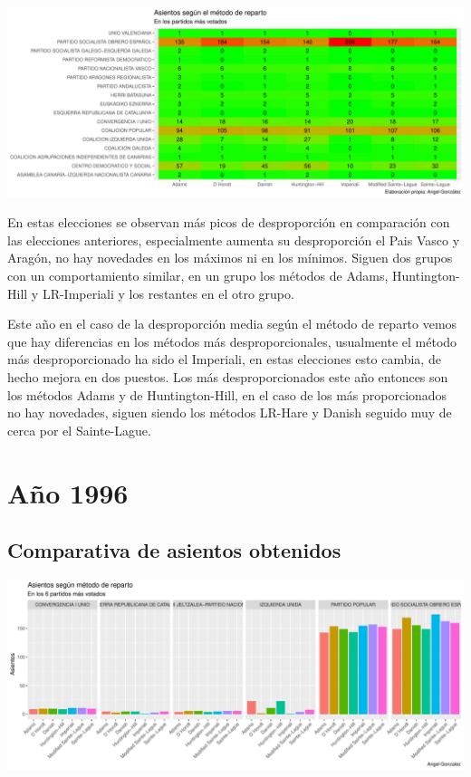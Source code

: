 \documentclass[12pt,a4paper,]{book}
\numberwithin{dummy}{section}
\theoremstyle{ocrenumbox}
\theoremstyle{blacknumex}
\theoremstyle{blacknumbox}
\theoremstyle{ocrenum}
\theoremstyle{ocrenum}
\begin{document}
\begin{center}\includegraphics[width=1\linewidth]{figurasR/unnamed-chunk-89-2} \end{center}

En estas elecciones se observan más picos de desproporción en
comparación con las elecciones anteriores, especialmente aumenta su
desproporción el Pais Vasco y Aragón, no hay novedades en los máximos ni
en los mínimos. Siguen dos grupos con un comportamiento similar, en un
grupo los métodos de Adams, Huntington-Hill y LR-Imperiali y los
restantes en el otro grupo.

Este año en el caso de la desproporción media según el método de reparto
vemos que hay diferencias en los métodos más desproporcionales,
usualmente el método más desproporcionado ha sido el Imperiali, en estas
elecciones esto cambia, de hecho mejora en dos puestos. Los más
desproporcionados este año entonces son los métodos Adams y de
Huntington-Hill, en el caso de los más proporcionados no hay novedades,
siguen siendo los métodos LR-Hare y Danish seguido muy de cerca por el
Sainte-Lague.

\hypertarget{auxf1o-1996}{%
\section{Año 1996}\label{auxf1o-1996}}

\hypertarget{comparativa-de-asientos-obtenidos-6}{%
\subsection{Comparativa de asientos
obtenidos}\label{comparativa-de-asientos-obtenidos-6}}

\begin{center}\includegraphics[width=1\linewidth]{figurasR/unnamed-chunk-91-1} \end{center}
\end{document}
